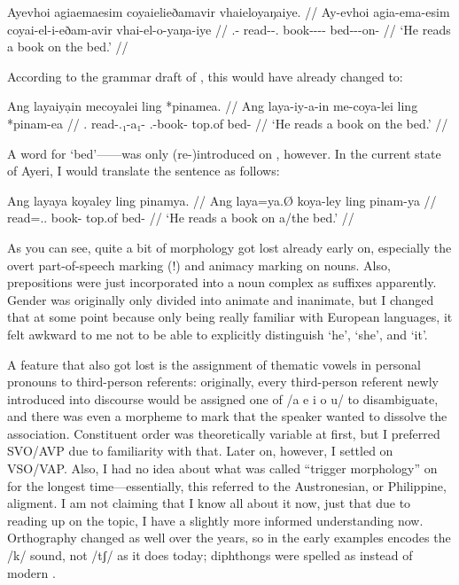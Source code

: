 \ex\begingl
	\gla Ayevhoi agiaemaesim coyaielieðamavir vhaieloyaŋaiye. //
	\glb Ay-evhoi agia-ema-esim coyai-el-i-eðam-avir vhai-el-o-yaŋa-iye //
	\glc \Tsg{}.\An{}-\Sbj{} read-\Vb{}-\Sbj{}.\An{} book-\Nn{}-\An{}-\Indf{}-\Parg{} bed-\Nn{}-\Inan{}-on-\Loc{} //
	\glft `He reads a book on the bed.' //
\endgl\xe

According to the grammar draft of , this would have already 
changed to:

\ex\begingl
	\gla Ang layaiyạin mecoyalei ling *pinamea. //
	\glb Ang laya-iy-a-in me-coya-lei ling *pinam-ea //
	\glc \Aarg{}.\Sbj{} read-\Tsg{}.\An{}₁-a₁-\Sbj{} \Indf{}.\Inan{}-book-\PargI{} top.of bed-\Loc{} //
	\glft `He reads a book on the bed.' //
\endgl\xe

A word for `bed'------was only (re-)introduced on 
, however. In the current state of Ayeri, I would translate 
the sentence as follows:

\ex\begingl
	\gla Ang layaya koyaley ling pinamya. //
	\glb Ang laya=ya.Ø koya-ley ling pinam-ya //
	\glc \AgtT{} read=\Tsg{}.\M{}.\Top{} book-\PargI{} top.of bed-\Loc{} //
	\glft `He reads a book on a/the bed.' //
\endgl\xe

As you can see, quite a bit of morphology got lost already early on, especially 
the overt part-of-speech marking (!) and animacy marking on nouns. Also, 
prepositions were just incorporated into a noun complex as suffixes apparently. 
Gender was originally only divided into animate and inanimate, but I changed 
that at some point because only being really familiar with European languages, 
it felt awkward to me not to be able to explicitly distinguish `he', `she', and 
`it'.

A feature that also got lost is the assignment of thematic vowels in personal 
pronouns to third-person referents: originally, every third-person referent 
newly introduced into discourse would be assigned one of /a e i o u/ to 
disambiguate, and there was even a morpheme to mark that the speaker wanted to 
dissolve the association. Constituent order was theoretically variable at first, 
but I preferred SVO/AVP due to familiarity with that. Later on, however, I 
settled on VSO/VAP. Also, I had no idea about what was called 
``trigger morphology'' on  for the longest time---essentially, 
this referred to the Austronesian, or Philippine, aligment. I am not claiming 
that I know all about it now, just that due to reading up on the topic, I have 
a slightly more informed understanding now. Orthography changed as well over 
the years, so  in the early examples encodes the /k/ sound, not /tʃ/ as 
it does today; diphthongs were spelled as  instead of modern .


